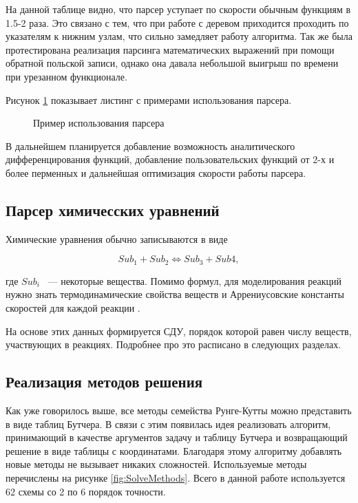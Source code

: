 На данной таблице видно, что парсер уступает по скорости обычным функциям в 1.5-2 раза. Это связано с тем, что при работе с деревом
приходится проходить по указателям к нижним узлам, что сильно замедляет работу алгоритма.
Так же была протестирована реализация парсинга математических выражений при помощи обратной польской записи, однако она давала небольшой
выигрыш по времени при урезанном функционале.

Рисунок \ref{src:FuncMaker} показывает листинг с примерами использования парсера.

\begin{figure}
    
    \caption{Пример использования парсера}
    \label{src:FuncMaker}
\end{figure}

В дальнейшем планируется добавление возможность аналитического дифференцирования функций, добавление пользовательских функций от 2-х и
более перменных и дальнейшая оптимизация скорости работы парсера.

\subsection{Парсер химичесских уравнений}

Химические уравнения обычно записываются в виде

\begin{equation}
    Sub_1 + Sub_2 \Longleftrightarrow Sub_3 + Sub4,
    \label{eq:Chemic}
\end{equation}

где $Sub_i$ ~--- некоторые вещества. Помимо формул, для моделирования реакций нужно знать термодинамические свойства веществ \cite{book3}
и Аррениусовские константы скоростей для каждой реакции \cite{book8}.

На основе этих данных формируется СДУ, порядок которой равен числу веществ, участвующих в реакциях. Подробнее про это расписано в
следующих разделах.

\subsection{Реализация методов решения}

Как уже говорилось выше, все методы семейства Рунге-Кутты можно представить в виде таблиц Бутчера. В связи с этим появилась идея
реализовать алгоритм, принимающий в качестве аргументов задачу и таблицу Бутчера и возвращающий решение в виде таблицы с координатами.
Благодаря этому алгоритму добавлять
новые методы не вызывает никаких сложностей. Используемые методы перечислены на рисунке \ref{fig:SolveMethods}.
Всего в данной работе используется 62 схемы со 2 по 6 порядок точности.

